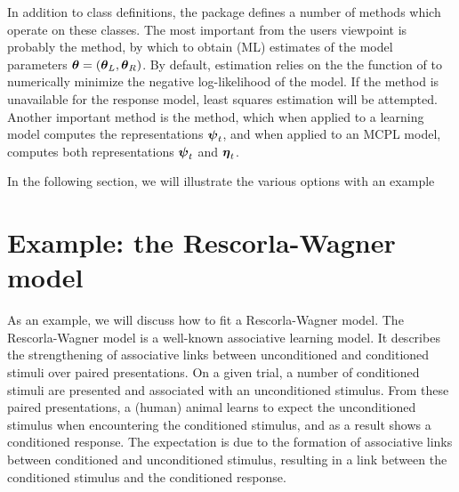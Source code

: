 \documentclass[doc]{apa}
\newcommand{\greekv}[1]{\mbox{\boldmath$#1$}}
\newcommand{\code}[1]{{\ttfamily{#1}}}
\begin{document}

In addition to class definitions, the \code{mcplR} package defines a number of methods which operate on these classes. The most important from the users viewpoint is probably the \code{fit} method, by which to obtain (ML) estimates of the model parameters $\greekv{\theta} = (\greekv{\theta}_L,\greekv{\theta}_R)$. By default, estimation relies on the the \code{optim} function of \code{R} to numerically minimize the negative log-likelihood of the model. If the \code{logLik} method is unavailable for the response model, least squares estimation will be attempted. Another important method is the \code{runm} method, which when applied to a learning model computes the representations $\greekv{\psi}_t$, and when applied to an MCPL model, computes both representations $\greekv{\psi}_t$ and $\greekv{\eta}_t$. 

In the following section, we will illustrate the various options with an example 

\section{Example: the Rescorla-Wagner model}

As an example, we will discuss how to fit a Rescorla-Wagner model. The Rescorla-Wagner model \cite{Rescorla72} is a well-known associative learning model. It describes the strengthening of associative links between unconditioned and conditioned stimuli over paired presentations. On a given trial, a number of conditioned stimuli are presented and associated with an unconditioned stimulus. From these paired presentations, a (human) animal learns to expect the unconditioned stimulus when encountering the conditioned stimulus, and as a result shows a conditioned response. The expectation is due to the formation of associative links between conditioned and unconditioned stimulus, resulting in a link between the conditioned stimulus and the conditioned response. 
\end{document}
